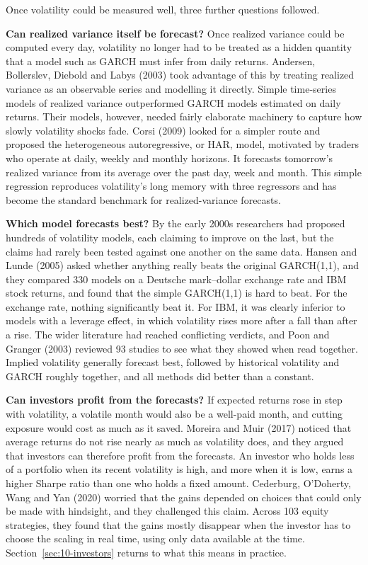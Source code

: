 Once volatility could be measured well, three further questions followed.

\textbf{Can realized variance itself be forecast?} Once realized variance could be computed every day, volatility no longer had to be treated as a hidden quantity that a model such as GARCH must infer from daily returns. Andersen, Bollerslev, Diebold and Labys (2003) took advantage of this by treating realized variance as an observable series and modelling it directly. Simple time-series models of realized variance outperformed GARCH models estimated on daily returns. Their models, however, needed fairly elaborate machinery to capture how slowly volatility shocks fade. Corsi (2009) looked for a simpler route and proposed the heterogeneous autoregressive, or HAR, model, motivated by traders who operate at daily, weekly and monthly horizons. It forecasts tomorrow's realized variance from its average over the past day, week and month. This simple regression reproduces volatility's long memory with three regressors and has become the standard benchmark for realized-variance forecasts.

\textbf{Which model forecasts best?} By the early 2000s researchers had proposed hundreds of volatility models, each claiming to improve on the last, but the claims had rarely been tested against one another on the same data. Hansen and Lunde (2005) asked whether anything really beats the original GARCH(1,1), and they compared 330 models on a Deutsche mark--dollar exchange rate and IBM stock returns, and found that the simple GARCH(1,1) is hard to beat. For the exchange rate, nothing significantly beat it. For IBM, it was clearly inferior to models with a leverage effect, in which volatility rises more after a fall than after a rise. The wider literature had reached conflicting verdicts, and Poon and Granger (2003) reviewed 93 studies to see what they showed when read together. Implied volatility generally forecast best, followed by historical volatility and GARCH roughly together, and all methods did better than a constant.

\textbf{Can investors profit from the forecasts?} If expected returns rose in step with volatility, a volatile month would also be a well-paid month, and cutting exposure would cost as much as it saved. Moreira and Muir (2017) noticed that average returns do not rise nearly as much as volatility does, and they argued that investors can therefore profit from the forecasts. An investor who holds less of a portfolio when its recent volatility is high, and more when it is low, earns a higher Sharpe ratio than one who holds a fixed amount. Cederburg, O'Doherty, Wang and Yan (2020) worried that the gains depended on choices that could only be made with hindsight, and they challenged this claim. Across 103 equity strategies, they found that the gains mostly disappear when the investor has to choose the scaling in real time, using only data available at the time. Section~\ref{sec:10-investors} returns to what this means in practice.

